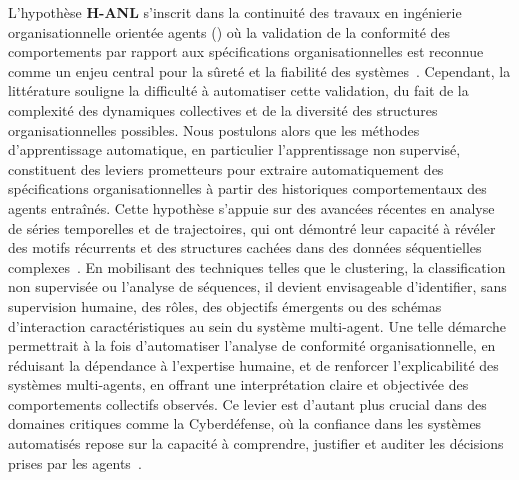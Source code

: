 \noindent L'hypothèse \textbf{H-ANL} s'inscrit dans la continuité des travaux en ingénierie organisationnelle orientée agents () où la validation de la conformité des comportements par rapport aux spécifications organisationnelles est reconnue comme un enjeu central pour la sûreté et la fiabilité des systèmes~\cite{Boella2006, Picard2009reorganisation}. Cependant, la littérature souligne la difficulté à automatiser cette validation, du fait de la complexité des dynamiques collectives et de la diversité des structures organisationnelles possibles. Nous postulons alors que les méthodes d'apprentissage automatique, en particulier l'apprentissage non supervisé, constituent des leviers prometteurs pour extraire automatiquement des spécifications organisationnelles à partir des historiques comportementaux des agents entraînés. Cette hypothèse s'appuie sur des avancées récentes en analyse de séries temporelles et de trajectoires, qui ont démontré leur capacité à révéler des motifs récurrents et des structures cachées dans des données séquentielles complexes~\cite{Zhang2021, Gunning2019}. En mobilisant des techniques telles que le clustering, la classification non supervisée ou l'analyse de séquences, il devient envisageable d'identifier, sans supervision humaine, des rôles, des objectifs émergents ou des schémas d'interaction caractéristiques au sein du système multi-agent. Une telle démarche permettrait à la fois d'automatiser l'analyse de conformité organisationnelle, en réduisant la dépendance à l'expertise humaine, et de renforcer l'explicabilité des systèmes multi-agents, en offrant une interprétation claire et objectivée des comportements collectifs observés. Ce levier est d'autant plus crucial dans des domaines critiques comme la Cyberdéfense, où la confiance dans les systèmes automatisés repose sur la capacité à comprendre, justifier et auditer les décisions prises par les agents~\cite{Gunning2019}.

\medskip

